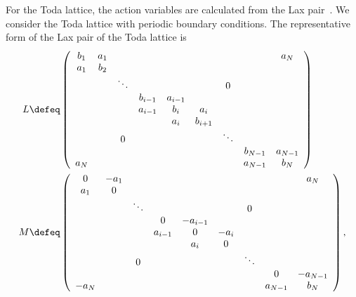 For the Toda lattice, the action variables are calculated from the Lax pair~\cite{Flaschka-McLaughlin1976,Flaschka1974}.
We consider the Toda lattice with periodic boundary conditions.
The representative form of the Lax pair of the Toda lattice is~\cite{Flaschka1974-2}
\begin{align}
  L & \defeq
  \left(
    \begin{array}{ccccccccc}
      b_1 & a_1 &       &        &         &         &       &         & a_N     \\
      a_1 & b_2 &       &        &         &         &       &         &         \\
          &     & \ddots &       &         &         & 0     &         &        \\
          &     &       &b_{i-1} & a_{i-1} &         &       &         &         \\
          &     &       &a_{i-1} & b_{i}   & a_i     &       &         &         \\
          &     &       &        & a_{i}   & b_{i+1} &       &         &         \\
          &     &  0    &        &         &         & \ddots &        &        \\
          &     &       &        &         &         &       & b_{N-1} & a_{N-1} \\
      a_N &     &       &        &         &         &       & a_{N-1} & b_{N}
    \end{array}
  \right) \label{eq:toda_lax_matrix}\\
  M & \defeq
  \left(
    \begin{array}{ccccccccc}
      0   &-a_1 &       &        &         &         &       &         & a_N     \\
      a_1 & 0   &       &        &         &         &       &         &         \\
          &     & \ddots &       &         &         & 0     &         &        \\
          &     &       &    0   & -a_{i-1}&         &       &         &         \\
          &     &       &a_{i-1} &   0     & -a_i    &       &         &         \\
          &     &       &        & a_{i}   &   0     &       &         &         \\
          &     &  0    &        &         &         & \ddots&         &        \\
          &     &       &        &         &         &       &    0    & - a_{N-1} \\
    - a_N &     &       &        &         &         &       & a_{N-1} & b_{N}
    \end{array}
  \right),
\end{align}
